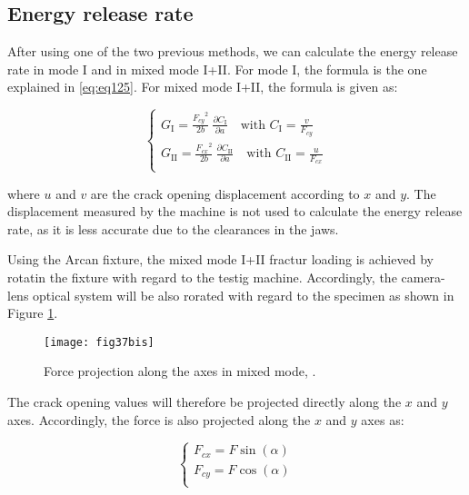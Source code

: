 \subsection{Energy release rate}

After using one of the two previous methods, we can calculate the energy release rate in mode I and in mixed mode I+II. For mode I, the formula is the one explained in \ref{eq:eq125}. For mixed mode I+II, the formula is given as:

\begin{equation}
	\begin{cases}
		G_\text{I}=\displaystyle\frac{{F_{cy}}^2}{2b}\ \frac{\partial C_\text{I}}{\partial a} \quad \text{with } C_\text{I}=\frac{v}{F_{cy}} \\
		G_\text{II}=\displaystyle\frac{{F_{cx}}^2}{2b}\ \frac{\partial C_\text{II}}{\partial a} \quad \text{with } C_\text{II}=\frac{u}{F_{cx}}\\
	\end{cases}
\label{eq:eq28}
\end{equation}

where $u$ and $v$ are the crack opening displacement according to $x$ and $y$. The displacement measured by the machine is not used to calculate the energy release rate, as it is less accurate due to the clearances in the jaws.

Using the Arcan fixture, the mixed mode I+II fractur loading is achieved by rotatin the fixture with regard to the testig machine. Accordingly, the camera-lens optical system will be also rorated with regard to the specimen as shown in Figure \ref{fig:fig37bis}.

\begin{figure}[htp]
	\centering
	\texttt{[image: fig37bis]}
	\caption{Force projection along the axes in mixed mode, \citep{Odounga2018phd}.}
	\label{fig:fig37bis}
\end{figure}

The crack opening values will therefore be projected directly along the $x$ and $y$ axes.
Accordingly, the force is also projected along the $x$ and $y$ axes as:


\begin{equation}
	\begin{cases}
		F_{cx}=F \sin(\alpha) \\
		F_{cy}=F \cos(\alpha) \\ 
	\end{cases}
	\label{eq:eq29}
\end{equation}

